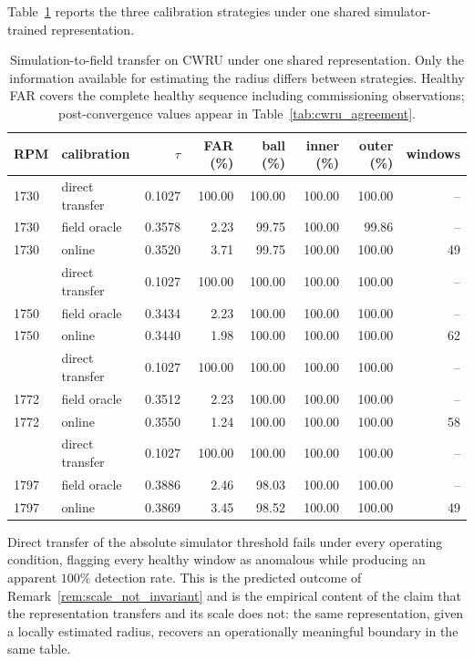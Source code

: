 \documentclass[a4paper]{cas-sc}
\begin{document}
Table~\ref{tab:cwru_transfer} reports the three calibration strategies under
one shared simulator-trained representation.

\begin{table}[!ht]
\centering
\caption{Simulation-to-field transfer on CWRU under one shared
representation. Only the information available for estimating the radius
differs between strategies. Healthy FAR covers the complete healthy sequence
including commissioning observations; post-convergence values appear in
Table~\ref{tab:cwru_agreement}.}
\label{tab:cwru_transfer}
\setlength{\tabcolsep}{4pt}
\begin{tabular}{llrrrrrr}
\toprule
RPM & calibration & \(\tau\) & FAR (\%) & ball (\%) & inner (\%) & outer (\%) & windows \\
\midrule
1730 & direct transfer & 0.1027 & 100.00 & 100.00 & 100.00 & 100.00 & -- \\
1730 & field oracle    & 0.3578 & 2.23   & 99.75  & 100.00 & 99.86  & -- \\
1730 & online          & 0.3520 & 3.71   & 99.75  & 100.00 & 100.00 & 49 \\
\addlinespace
1750 & direct transfer & 0.1027 & 100.00 & 100.00 & 100.00 & 100.00 & -- \\
1750 & field oracle    & 0.3434 & 2.23   & 100.00 & 100.00 & 100.00 & -- \\
1750 & online          & 0.3440 & 1.98   & 100.00 & 100.00 & 100.00 & 62 \\
\addlinespace
1772 & direct transfer & 0.1027 & 100.00 & 100.00 & 100.00 & 100.00 & -- \\
1772 & field oracle    & 0.3512 & 2.23   & 100.00 & 100.00 & 100.00 & -- \\
1772 & online          & 0.3550 & 1.24   & 100.00 & 100.00 & 100.00 & 58 \\
\addlinespace
1797 & direct transfer & 0.1027 & 100.00 & 100.00 & 100.00 & 100.00 & -- \\
1797 & field oracle    & 0.3886 & 2.46   & 98.03  & 100.00 & 100.00 & -- \\
1797 & online          & 0.3869 & 3.45   & 98.52  & 100.00 & 100.00 & 49 \\
\bottomrule
\end{tabular}
\end{table}

Direct transfer of the absolute simulator threshold fails under every
operating condition, flagging every healthy window as anomalous while
producing an apparent \(100\%\) detection rate. This is the predicted outcome
of Remark~\ref{rem:scale_not_invariant} and is the empirical content of the
claim that the representation transfers and its scale does not: the same
representation, given a locally estimated radius, recovers an operationally
meaningful boundary in the same table.
\end{document}
